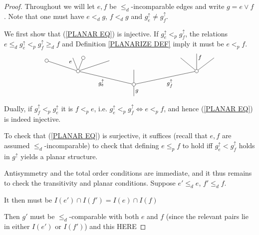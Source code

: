 \documentclass[a4paper,10pt]{article}%
\begin{document}
\begin{proof}
Throughout we will let $e, f$ be $\leq_d$-incomparable edges and write 
$g = e \vee f$. Note that one must have $e <_d g$, $f <_d g$ and 
$g^{\uparrow}_e \neq g^{\uparrow}_f$. 

	We first show that (\ref{PLANAR EQ}) is injective.
If $g^{\uparrow}_e <_p g^{\uparrow}_f$, the relations
$e \leq_d g^{\uparrow}_e <_p g^{\uparrow}_f \geq_d f$
and Definition \ref{PLANARIZE DEF} imply it must be $e <_p f$.
\[
	\begin{tikzpicture}[grow=up,auto,level distance=1.9em,
	every node/.style = {font=\footnotesize,inner sep=2pt},
	dummy/.style={circle,draw,inner sep=0pt,minimum size=1.75mm}]
		\node at (0,0) {}
			child{node [dummy] {}
				child[sibling distance = 9em]{node [dummy] {}
					child[sibling distance = 2.5em]{
					edge from parent node [near end,swap] {}}
					child[level distance=2.5em]{
					edge from parent node [near end,swap] {$f$}}				
					child[sibling distance = 2.3em]{
					edge from parent node [near end] {}}
				edge from parent node [swap] {$g^{\uparrow}_{f}$}}
				child[level distance =2.1em]{
				edge from parent node [swap] {}}
				child[sibling distance = 8em]{node [dummy] {}
					child[sibling distance =3em, level distance = 1.5 em]{
					edge from parent node [swap] {}}
					child[sibling distance = 1.5em]{node [dummy] {}
					edge from parent node [very near end,swap] {}}
					child[sibling distance =1.5em]{
					edge from parent node [very near end] {$e$}}
					child[sibling distance =3em,level distance =1.5em]{node [dummy] {}
					edge from parent node {}}
				edge from parent node {$g^{\uparrow}_e$}}
			edge from parent node [swap] {$g$}};
	\end{tikzpicture}
\]
Dually, if $g^{\uparrow}_f <_p g^{\uparrow}_e$ it is 
$f <_p e$, i.e. 
$g^{\uparrow}_e <_p g^{\uparrow}_f \Leftrightarrow e <_p f$, and hence (\ref{PLANAR EQ}) is indeed injective.

To check that (\ref{PLANAR EQ}) is surjective, it suffices (recall that $e,f$ are assumed $\leq_d$-incomparable) to check that
defining $e \leq_p f$ to hold iff $g^{\uparrow}_e < g^{\uparrow}_f$ holds in $g^{\uparrow}$ yields a planar structure.

Antisymmetry and the total order conditions are immediate, and it thus remains to check the transitivity and planar conditions.
Suppose $e' \leq_d e$, $f' \leq_d f$.

It then must be $I(e') \cap I(f') = I(e) \cap I(f)$

Then $g'$ must be $\leq_d$-comparable with both $e$ and $f$ (since the relevant pairs lie in either $I(e')$ or $I(f')$)
and this 
{\color{red} HERE}
 


\end{proof}
\end{document}
